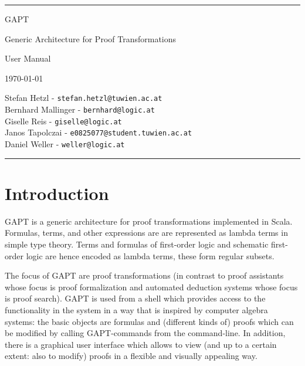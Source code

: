 \documentclass[a4paper,11pt]{article}
\begin{document}
\begin{titlepage}
\begin{center}

\hrule

\vspace*{20mm}

{\Huge GAPT}

\vspace*{5mm}

{\huge Generic Architecture for Proof Transformations}

\vspace*{20mm}

{\Huge User Manual}

\vspace*{50mm}

{\Large \today}

\vspace*{20mm}

{\Large
Stefan Hetzl - \texttt{stefan.hetzl@tuwien.ac.at}\\
Bernhard Mallinger - \texttt{bernhard@logic.at}\\
Giselle Reis - \texttt{giselle@logic.at}\\
Janos Tapolczai - \texttt{e0825077@student.tuwien.ac.at}\\
Daniel Weller - \texttt{weller@logic.at}
}

\vspace*{20mm}

\hrule
\end{center}



\end{titlepage}

\tableofcontents
\vfill
\pagebreak

\section{Introduction}

GAPT is a generic architecture for proof transformations implemented in Scala.
Formulas, terms, and other expressions are are represented as lambda terms in
simple type theory.  Terms and formulas of first-order logic and schematic
first-order logic are hence encoded as lambda terms, these form regular
subsets.

The focus of GAPT are proof transformations (in contrast to proof assistants
whose focus is proof formalization and automated deduction systems whose focus
is proof search). GAPT is used from a shell which provides access to the functionality
in the system in a way that is inspired by computer algebra systems: the basic
objects are formulas and (different kinds of) proofs which can be modified
by calling GAPT-commands from the command-line. In addition, there
is a graphical user interface which allows to view (and up to a certain extent:
also to modify) proofs in a flexible and visually appealing way.
\end{document}
